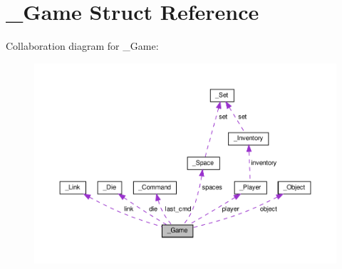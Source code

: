 \hypertarget{struct__Game}{}\section{\+\_\+\+Game Struct Reference}
\label{struct__Game}


Collaboration diagram for \+\_\+\+Game\+:\nopagebreak
\begin{figure}[H]
\begin{center}
\leavevmode
\includegraphics[width=350pt]{struct__Game__coll__graph}
\end{center}
\end{figure}
